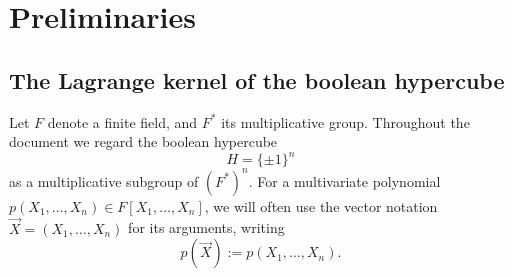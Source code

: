 \documentclass[11pt]{article}
\theoremstyle{definition}
\theoremstyle{remark}
\begin{document}
\section{Preliminaries}

\subsection{The Lagrange kernel of the boolean hypercube}

Let $F$ denote a finite field, and $F^*$ its multiplicative group.
Throughout the document we regard the boolean hypercube 
\[
H= \{\pm 1\}^n
\] 
as a multiplicative subgroup of  $(F^*)^n$.
For a multivariate polynomial $p(X_1,\ldots, X_n)\in F[X_1,\ldots, X_n]$, we will often use the vector notation $\vec X = (X_1,\ldots, X_n)$ for its arguments, writing 
\[
p(\vec X) := p(X_1,\ldots, X_n).
\] 

\end{document}
